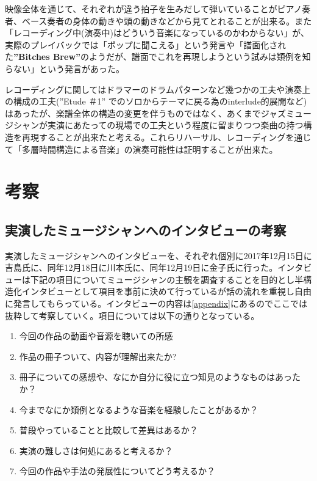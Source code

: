 \documentclass[uplatex,dvipdfmx]{ujarticle}
\begin{document}
映像全体を通じて、それぞれが違う拍子を生みだして弾いていることがピアノ奏者、ベース奏者の身体の動きや頭の動きなどから見てとれることが出来る。また「レコーディング中(演奏中)はどういう音楽になっているのかわからない」が、実際のプレイバックでは「ポップに聞こえる」という発言や「譜面化された{\bf ''Bitches Brew''}\cite{miles:02}のようだが、譜面でこれを再現しようという試みは類例を知らない」という発言があった。

レコーディングに関してはドラマーのドラムパターンなど幾つかの工夫や演奏上の構成の工夫(''Etude ＃1'' でのソロからテーマに戻る為のinterlude的展開など)はあったが、楽譜全体の構造の変更を伴うものではなく、あくまでジャズミュージシャンが実演にあたっての現場での工夫という程度に留まりつつ楽曲の持つ構造を再現することが出来たと考える。これらリハーサル、レコーディングを通じて「多層時間構造による音楽」の演奏可能性は証明することが出来た。

\section{考察}

\subsection{実演したミュージシャンへのインタビューの考察}

実演したミュージシャンへのインタビューを、それぞれ個別に2017年12月15日に吉島氏に、同年12月18日に川本氏に、同年12月19日に金子氏に行った。インタビューは下記の項目についてミュージシャンの主観を調査することを目的とし半構造化インタビューとして項目を事前に決めて行っているが話の流れを重視し自由に発言してもらっている。インタビューの内容は\ref{appendix}にあるのでここでは抜粋して考察していく。項目については以下の通りとなっている。

\begin{enumerate}
  \item 今回の作品の動画や音源を聴いての所感
  \item 作品の冊子ついて、内容が理解出来たか?
	\item 冊子についての感想や、なにか自分に役に立つ知見のようなものはあったか？
  \item 今までなにか類例となるような音楽を経験したことがあるか？
	\item 普段やっていることと比較して差異はあるか？
	\item 実演の難しさは何処にあると考えるか？
  \item 今回の作品や手法の発展性についてどう考えるか？
\end{enumerate}
\end{document}
